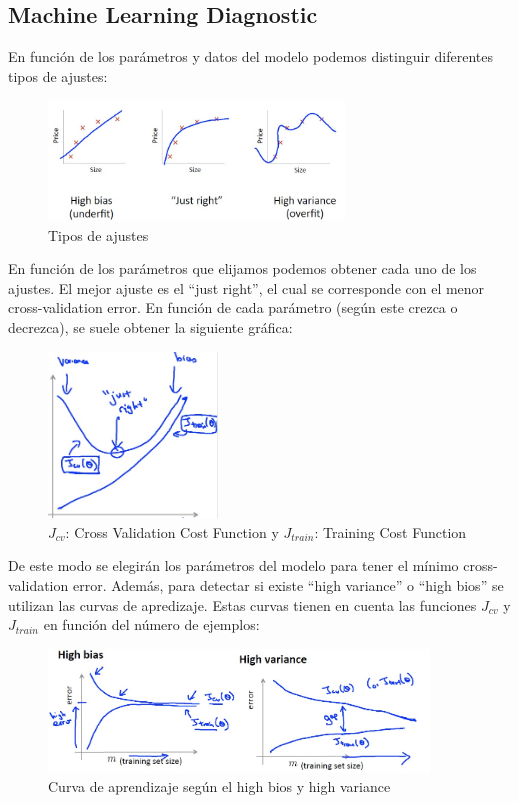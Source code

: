 \documentclass[12pt,a4paper]{article}
\begin{document}
\subsection{Machine Learning Diagnostic}
En función de los parámetros y datos del modelo podemos distinguir diferentes tipos de ajustes:

\begin{figure}[htb]
\center
\includegraphics[width=0.7\textwidth]{diag}
\caption{Tipos de ajustes}
\end{figure}


En función de los parámetros que elijamos podemos obtener cada uno de los ajustes. El mejor ajuste es el ``just right'', el cual se corresponde con el menor cross-validation error. En función de cada parámetro (según este crezca o decrezca), se suele obtener la siguiente gráfica:

\begin{figure}[htb]
\center
\includegraphics[width=0.4\textwidth]{error}
\caption{$J_{cv}$: Cross Validation Cost Function y $J_{train}$: Training Cost Function}
\end{figure}

De este modo se elegirán los parámetros del modelo para tener el mínimo cross-validation error. Además, para detectar si existe ``high variance'' o ``high bios'' se utilizan las curvas de apredizaje. Estas curvas tienen en cuenta las funciones $J_{cv}$ y $J_{train}$ en función del número de ejemplos:

\begin{figure}[htb]
\center
\includegraphics[width=0.9\textwidth]{learning_curve}
\caption{Curva de aprendizaje según el high bios y high variance}
\end{figure}
\end{document}

